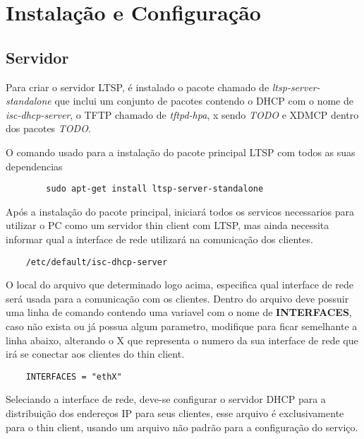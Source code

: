 \documentclass[
	12pt,				%
	openright,			%
	twoside,			%
	a4paper,			%
	chapter=TITLE,		%
	english,			%
	brazil				%
	]{abntex2}
\begin{document}


\part{Instalação e Configuração}

\chapter{Servidor}

Para criar o servidor LTSP, é instalado o pacote chamado de \textit{ltsp-server-standalone} que inclui um conjunto de pacotes contendo o DHCP com o nome de \textit{isc-dhcp-server}, o TFTP chamado de \textit{tftpd-hpa}, x sendo \textit{TODO} e XDMCP dentro dos pacotes \textit{TODO}.


O comando usado para a instalação do pacote principal LTSP com todos as suas dependencias

\begin{verbatim}
		sudo apt-get install ltsp-server-standalone
\end{verbatim}


Após a instalação do pacote principal, iniciará todos os servicos necessarios para utilizar o PC como um servidor thin client com LTSP, mas ainda necessita informar qual a interface de rede utilizará na comunicação dos clientes.

\begin{verbatim}
	/etc/default/isc-dhcp-server
\end{verbatim}  

O local do arquivo que determinado logo acima, especifica qual interface de rede será usada para a comunicação com os clientes. Dentro do arquivo deve possuir uma linha de comando contendo uma variavel com o nome de \textbf{INTERFACES}, caso não exista ou já possua algum parametro, modifique para ficar semelhante a linha abaixo, alterando o X  que representa o numero da sua interface de rede que irá se conectar aos clientes do thin client.

\begin{verbatim}
	INTERFACES = "ethX"
\end{verbatim}

Seleciando a interface de rede, deve-se configurar o servidor DHCP para a distribuição dos endereços IP para seus clientes, esse arquivo é exclusivamente para o thin client, usando um arquivo não padrão para a configuração do serviço. 
\end{document}
